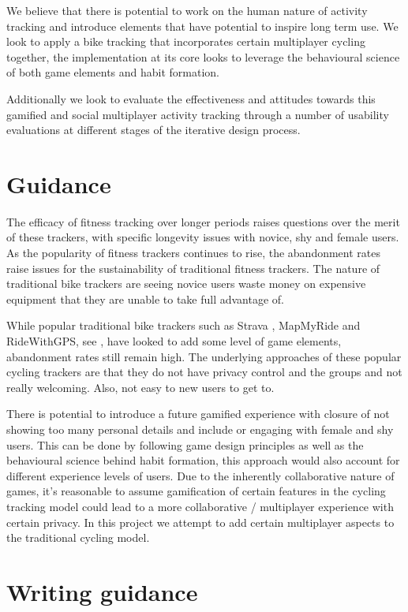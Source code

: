 \documentclass{l4proj}
\begin{document}
We believe that there is potential  to work on the human nature of activity tracking and introduce elements that have potential to inspire long term use. We look to apply a bike tracking that incorporates certain multiplayer cycling together, the implementation at its core looks to leverage the behavioural science of both game elements and habit formation.  

Additionally we look to evaluate the effectiveness and attitudes towards this gamified and social multiplayer activity tracking through a number of usability evaluations at different stages of the iterative design process.

\section{Guidance}


The efficacy of fitness tracking over longer periods raises questions over the merit of these trackers, with specific longevity issues with novice, shy and female users. As the popularity of fitness trackers continues to rise, the abandonment rates raise issues for the sustainability of traditional fitness trackers. The nature of traditional bike trackers are seeing novice users waste money on expensive equipment that they are unable to take full advantage of.


While popular traditional bike trackers such as Strava , MapMyRide and RideWithGPS, see \cite{lee2021strava}, \cite{bergman2016conflation} have looked to add some level of game elements, abandonment rates still remain high. The underlying approaches of these popular cycling trackers are that they do not have privacy control and the groups and not really welcoming. Also, not easy to new users to get to.

There is potential to introduce a future gamified experience with closure of not showing too many personal details and include or engaging with female and shy users. This can be done by following game design principles as well as the behavioural science behind habit formation, this approach would also account for different experience levels of users. Due to the inherently collaborative nature of games, it’s reasonable to assume gamification of certain features in the cycling tracking model could lead to a more collaborative / multiplayer experience with certain privacy. In this project we attempt to add certain multiplayer aspects to the traditional cycling model.

\section{Writing guidance}
\end{document}

